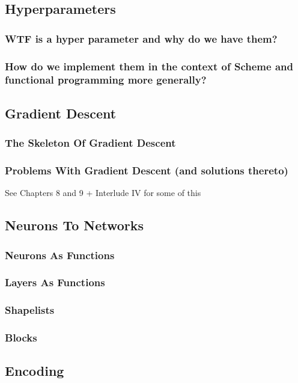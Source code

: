 \documentclass[11pt]{article}
\begin{document}
\subsection{Hyperparameters}
\label{sec:orgd220498}
\subsubsection{WTF is a hyper parameter and why do we have them?}
\label{sec:orgba61fd5}
\subsubsection{How do we implement them in the context of Scheme and functional programming more generally?}
\label{sec:org87cfa9f}
\subsection{Gradient Descent}
\label{sec:org3fac7b7}
\subsubsection{The Skeleton Of Gradient Descent}
\label{sec:org2ef799a}
\subsubsection{Problems With Gradient Descent (and solutions thereto)}
\label{sec:orgc6977ad}
See Chapters 8 and 9 + Interlude IV for some of this
\subsection{Neurons To Networks}
\label{sec:org7e5b9c5}
\subsubsection{Neurons As Functions}
\label{sec:orgd5d362b}
\subsubsection{Layers As Functions}
\label{sec:org96147a8}
\subsubsection{Shapelists}
\label{sec:org81e51e5}
\subsubsection{Blocks}
\label{sec:org7acbf87}
\subsection{Encoding}
\label{sec:orge7d0652}
\end{document}
